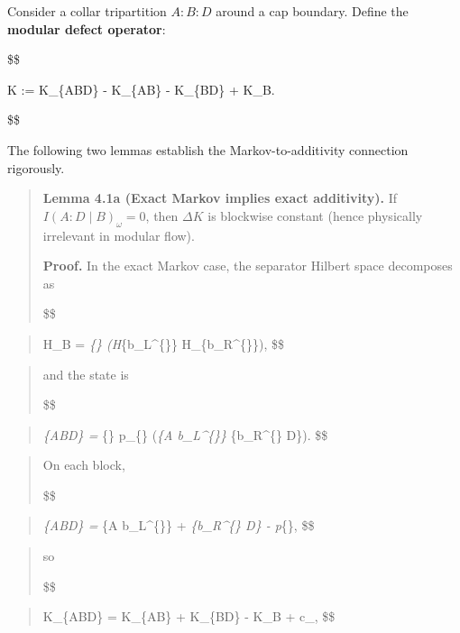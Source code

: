 \documentclass[11pt,a4paper]{article}
\theoremstyle{remark}
\begin{document}
Consider a collar tripartition \(A:B:D\) around a cap boundary. Define the
\textbf{modular defect operator}:

\$\$

\Delta K := K\_\{ABD\} - K\_\{AB\} - K\_\{BD\} + K\_B.

\$\$

The following two lemmas establish the Markov-to-additivity connection rigorously.

\begin{quote}
\textbf{Lemma 4.1a (Exact Markov implies exact additivity).} If
\(I(A:D \mid B)_\omega = 0\), then \(\Delta K\) is blockwise constant (hence
physically irrelevant in modular flow).

\textbf{Proof.} In the exact Markov case, the separator Hilbert space decomposes as

\$\$
\end{quote}

\begin{quote}
\mathcal H\_B = \bigoplus\emph{\{\alpha\} (\mathcal H}\{b\_L\^{}\{\alpha\}\} \otimes \mathcal H\_\{b\_R\^{}\{\alpha\}\}),
\$\$
\end{quote}

\begin{quote}
and the state is

\$\$
\end{quote}

\begin{quote}
\rho\emph{\{ABD\} = \bigoplus}\{\alpha\} p\_\{\alpha\}
(\rho\emph{\{A b\_L\^{}\{\alpha\}\} \otimes \rho}\{b\_R\^{}\{\alpha\} D\}).
\$\$
\end{quote}

\begin{quote}
On each block,

\$\$
\end{quote}

\begin{quote}
\log \rho\emph{\{ABD\} = \log \rho}\{A b\_L\^{}\{\alpha\}\} + \log \rho\emph{\{b\_R\^{}\{\alpha\} D\} - \log p}\{\alpha\},
\$\$
\end{quote}

\begin{quote}
so

\$\$
\end{quote}

\begin{quote}
K\_\{ABD\} = K\_\{AB\} + K\_\{BD\} - K\_B + c\_\alpha,
\$\$
\end{quote}
\end{document}
